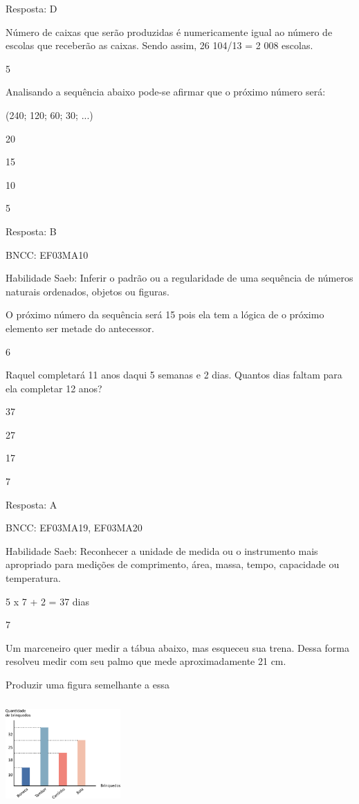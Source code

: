 \begin{escolha}
\begin{escolha}
Resposta: D

Número de caixas que serão produzidas é numericamente igual ao número de
escolas que receberão as caixas. Sendo assim, 26 104/13 = 2 008 escolas.

\num{5}

Analisando a sequência abaixo pode-se afirmar que o próximo número será:

(240; 120; 60; 30; ...)

\begin{escolha}
\item
  20
\item
  15
\item
  10
\item
  5
\end{escolha}

Resposta: B

BNCC: EF03MA10

Habilidade Saeb: Inferir o padrão ou a regularidade de uma sequência de
números naturais ordenados, objetos ou figuras.

O próximo número da sequência será 15 pois ela tem a lógica de o próximo
elemento ser metade do antecessor.

\num{6}

Raquel completará 11 anos daqui 5 semanas e 2 dias. Quantos dias faltam
para ela completar 12 anos?

\begin{escolha}
\item
  37
\item
  27
\item
  17
\item
  7
\end{escolha}

Resposta: A

BNCC: EF03MA19, EF03MA20

Habilidade Saeb: Reconhecer a unidade de medida ou o instrumento mais
apropriado para medições de comprimento, área, massa, tempo, capacidade
ou temperatura.

5 x 7 + 2 = 37 dias

\num{7}

Um marceneiro quer medir a tábua abaixo, mas esqueceu sua trena. Dessa
forma resolveu medir com seu palmo que mede aproximadamente 21 cm.

Produzir uma figura semelhante a essa

\includegraphics[width=1.73077in,height=1.57654in]{media/image119.png}


\end{escolha}
\end{escolha}
